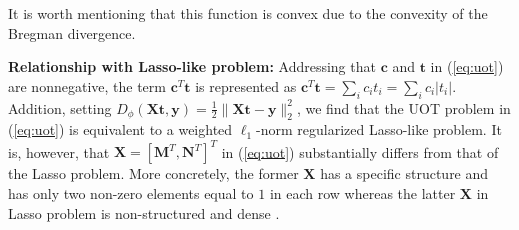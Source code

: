 \documentclass[twoside]{article}
\theoremstyle{plain}
\newcommand{\mat}[1]{\mathbf{#1}}
\renewcommand{\vec}[1]{\bm{#1}}
\begin{document}
It is worth mentioning that this function is convex due to the convexity of the Bregman divergence.

{\bf Relationship with Lasso-like problem:} 
%
%
%
Addressing that $\vec{c}$ and $\vec{t}$ in (\ref{eq:uot}) are nonnegative, the term $\vec{c}^T\vec{t}$ is represented as $\vec{c}^T\vec{t}=\sum_i c_i t_i = \sum_ic_i |t_i|$. Addition,  setting $D_\phi(\mat{X} \vec{t},\vec{y}) = \frac{1}{2}\|\mat{X} \vec{t}-\vec{y}\|_2^2$, we find that the UOT problem in (\ref{eq:uot}) is equivalent to a weighted $\ell_1$-norm regularized Lasso-like problem. It is, however, that $\mat{X} = [\mat{M}^T,\mat{N}^T]^T$ in (\ref{eq:uot}) substantially differs from that of the Lasso problem. More concretely, the former $\mat{X}$ has a specific structure and has only two non-zero elements equal to $1$ in each row whereas the latter $\mat{X}$ in Lasso problem is non-structured and dense \citep{Chapel_NeurIPS_2021}.
\end{document}
